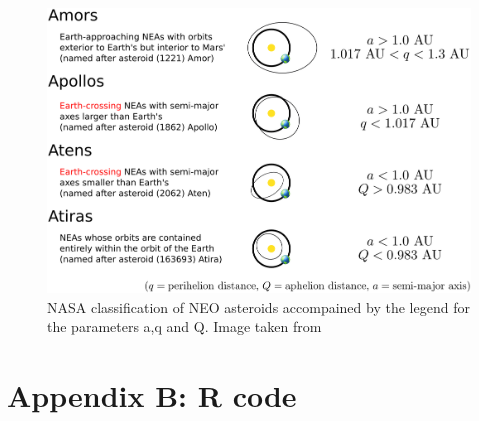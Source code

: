 \documentclass[12pt,%
               a4paper,%
               oneside,openany,%
               titlepage,%
               headinclude,footinclude,%
               BCOR5mm,%
               cleardoublepage=empty,%
               tablecaptionabove,%
               floatperchapter,
               ]{scrreprt}                 %
\begin{document}
\begin{figure}[h]
\begin{center}
\includegraphics[width=1\textwidth]{Figures/neo_orbit_types.jpg}
\caption{NASA classification of NEO asteroids accompained by the legend for the parameters a,q and Q. Image taken from \cite{nasa_classification}}
\label{neo_orbit_types}
\end{center}
\end{figure}

\chapter{Appendix B: R code}






\newpage



\end{document}

